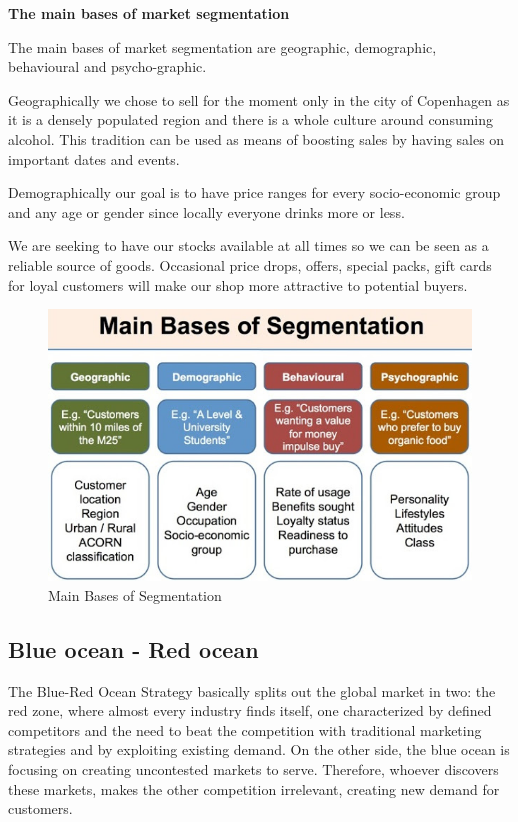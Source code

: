 \documentclass[12p]{article}
\begin{document}
\textbf{The main bases of market segmentation}

The main bases of market segmentation are geographic, demographic, behavioural and psycho-graphic. 

Geographically we chose to sell for the moment only in the city of Copenhagen as it is a densely populated region and there is a whole culture around consuming alcohol. This tradition can be used as means of boosting sales by having sales on important dates and events.

Demographically our goal is to have price ranges for every socio-economic group and any age or gender since locally everyone drinks more or less.

We are seeking to have our stocks available at all times so we can be seen as a reliable source of goods. Occasional price drops, offers, special packs, gift cards for loyal customers will make our shop more attractive to potential buyers.

\begin{figure}
    \centering
    \includegraphics[width=1\textwidth]{market_segmentation}
    \caption{Main Bases of Segmentation \cite{MarketSegmentationBases}}
\end{figure}

\newpage


\subsection{Blue ocean - Red ocean} \label{BlueOceanRedOcean}

The Blue-Red Ocean Strategy basically splits out the global market in two: the red zone, where almost every industry finds itself, one characterized by defined competitors and the need to beat the competition with traditional marketing strategies and by exploiting existing demand.
On the other side, the blue ocean is focusing on creating uncontested markets to serve. Therefore, whoever discovers these markets, makes the other competition irrelevant, creating new demand for customers.\cite{BlueOceanRedOcean}
\end{document}
